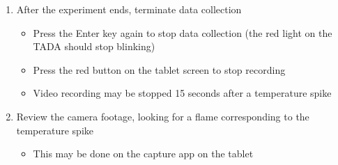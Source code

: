 \documentclass[letterpaper,11pt]{article}
\begin{document}
\begin{enumerate}
    \item After the experiment ends, terminate data collection
        \begin{itemize}
        \item Press the Enter key  again to stop data 
            collection (the red light on the TADA should stop blinking)
        \item Press the red button on the tablet screen to stop recording
        \item Video recording may be stopped 15 seconds after a temperature 
            spike
        \end{itemize}

    \item Review the camera footage, looking for a flame corresponding to the 
        temperature spike
        \begin{itemize}
        \item This may be done on the capture app on the tablet
        \end{itemize}
        

\end{enumerate}
\end{document}
